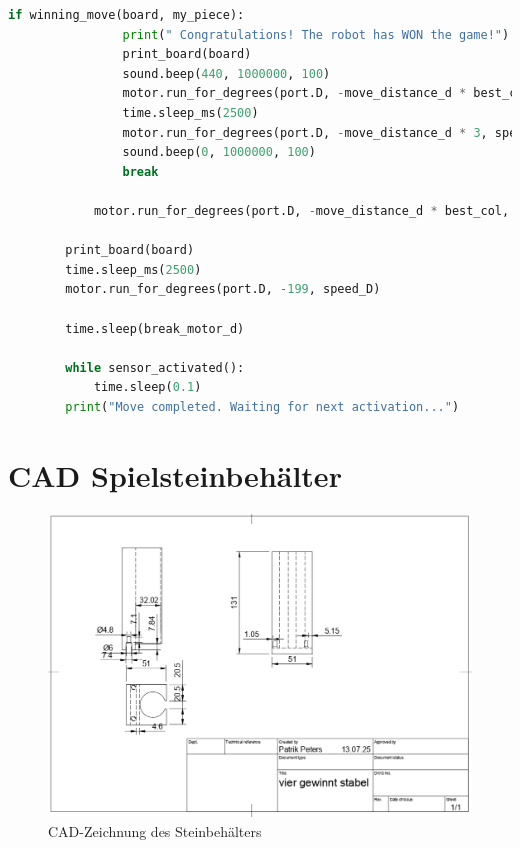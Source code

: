 \begin{lstlisting}[language=Python]
			if winning_move(board, my_piece):
				print(" Congratulations! The robot has WON the game!")
				print_board(board)
				sound.beep(440, 1000000, 100)
				motor.run_for_degrees(port.D, -move_distance_d * best_col, speed_D)
				time.sleep_ms(2500)
				motor.run_for_degrees(port.D, -move_distance_d * 3, speed_D)
				sound.beep(0, 1000000, 100)
				break
				
			motor.run_for_degrees(port.D, -move_distance_d * best_col, speed_D)
		
		print_board(board)
		time.sleep_ms(2500)
		motor.run_for_degrees(port.D, -199, speed_D)
		
		time.sleep(break_motor_d)
		
		while sensor_activated():
			time.sleep(0.1)
		print("Move completed. Waiting for next activation...")
\end{lstlisting}
\clearpage

\setcounter{chapter}{2}
\section{CAD Spielsteinbehälter}
\begin{figure}[H]
	\centering
	\includegraphics[width=1\linewidth]{images/CAD_Stapel}
	\caption[CAD Steinbehälter]{CAD-Zeichnung des Steinbehälters}
	\label{fig:cadstapel}
\end{figure}

